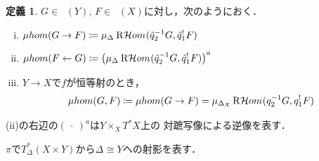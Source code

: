 \documentclass[leqno, 10pt, a4paper, dvipdfmx]{jsarticle}
\theoremstyle{definition}
\numberwithin{equation}{section}
\newcommand{\Dompb}{\mathop{\mathsf{D}^\mathrm{b}}\nolimits}
\newcommand{\HOM}{\mathop{\mathcal{H}\hspace{-0pt}om}\nolimits}%
\newcommand{\RHOM}{\mathop{\mathrm{R}\hspace{-1.5pt}\HOM}\nolimits}
\newcommand{\blk}{\mathord{\ \cdot\ }}
\newcommand{\tpb}[1][]{\mathbin{\mathop{\times}\nolimits_{#1}}}
\theoremstyle{mystyle}
\newtheorem{DFN}[AXM]{定義}
\newcommand{\cotb}[1][]{T^{\ast}{#1}}
\newcommand{\muhom}{\mu hom}
\newcommand{\diag}[1][]{\Delta_{#1}}
\newcommand{\micro}[1]{\mu_{#1}\hspace{-0pt}}
\begin{document}
\begin{DFN}\label{dfn4.4.1}
  \(G\in\Dompb(Y)\), \(F\in\Dompb(X)\)に対し，次のようにおく．
  \begin{enumerate}[(i)]
    \item \(
      \muhom(G\to F)
      \coloneqq
      \micro{\diag[]}\RHOM_{
        }(\tilde{q}_2^{-1}G,\tilde{q}_1^{!}F)\)
    \item \(
      \muhom(F\leftarrow G)
      \coloneqq
      \left(
        \micro{\diag[]}\RHOM_{
        }(\tilde{q}_2^{-1}G,\tilde{q}_1^{!}F)
      \right)^{a}\)
    \item \(Y\to X\)で\(f\)が恒等射のとき，\[
      \muhom(G,F)
      \coloneqq\muhom(G\to F)
      =\micro{\diag[X]}\RHOM_{
      }({q}_2^{-1}G,{q}_1^{!}F)
    \]
  \end{enumerate}
\end{DFN}
(ii)の右辺の\((\blk)^{a}\)は\(Y\tpb[X]\cotb[X]\)上の
対蹠写像による逆像を表す．

\(\pi\)で\(T^{\ast}_{\diag[]}(X\times Y)\)から\(\diag[]\cong Y\)への射影を表す．
\end{document}

